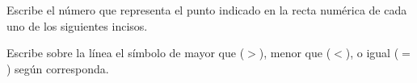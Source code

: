 \documentclass[12pt,addpoints]{evalua}
\begin{document}
\begin{questions}
    \question[4] Escribe el número que representa el punto indicado en la recta numérica de cada uno de los siguientes incisos.

    \begin{multicols}{2}
    \end{multicols}

    \question[4] Escribe sobre la línea el símbolo de mayor que ($>$), menor que ($<$), o igual ($=$) según corresponda.
   
    \begin{multicols}{2}
\end{multicols}
\end{questions}
\end{document}
